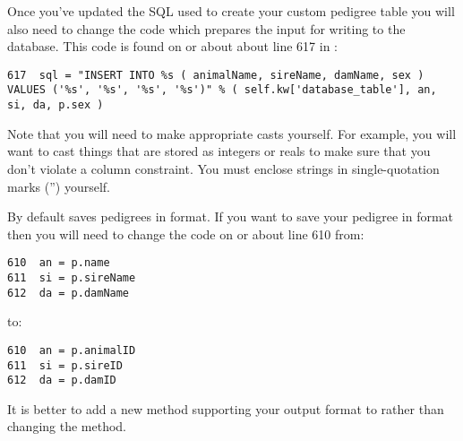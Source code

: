 Once you've updated the SQL used to create your custom pedigree table you will also need to change the code which prepares the input for writing to the database. This code is found on or about about line 617 in :
\begin{verbatim}
617  sql = "INSERT INTO %s ( animalName, sireName, damName, sex ) VALUES ('%s', '%s', '%s', '%s')" % ( self.kw['database_table'], an, si, da, p.sex )
\end{verbatim}
Note that you will need to make appropriate casts yourself. For example, you will want 
to cast things that are stored as integers or reals to make sure that you don't violate 
a column constraint. You must enclose strings in single-quotation marks ('') yourself. 

By default \PyPedal{} saves pedigrees in  format. If you want to save your pedigree in  format then you will need to change the code on or about line 610 from:
\begin{verbatim}
610  an = p.name
611  si = p.sireName
612  da = p.damName
\end{verbatim}
to:
\begin{verbatim}
610  an = p.animalID
611  si = p.sireID
612  da = p.damID
\end{verbatim}
It is better to add a new method supporting your output format to    rather than changing the  method.
